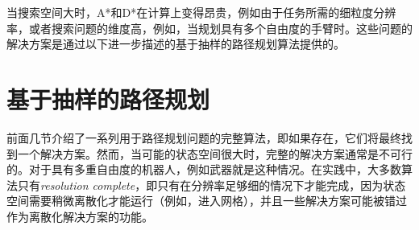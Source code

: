 当搜索空间大时，A*和D*在计算上变得昂贵，例如由于任务所需的细粒度分辨率，或者搜索问题的维度高，例如，当规划具有多个自由度的手臂时。这些问题的解决方案是通过以下进一步描述的基于抽样的路径规划算法提供的。

\section{基于抽样的路径规划}


前面几节介绍了一系列用于路径规划问题的完整算法，即如果存在，它们将最终找到一个解决方案。然而，当可能的状态空间很大时，完整的解决方案通常是不可行的。对于具有多重自由度的机器人，例如武器就是这种情况。在实践中，大多数算法只有\emph{resolution complete}，即只有在分辨率足够细的情况下才能完成，因为状态空间需要稍微离散化才能运行（例如，进入网格），并且一些解决方案可能被错过作为离散化解决方案的功能。


